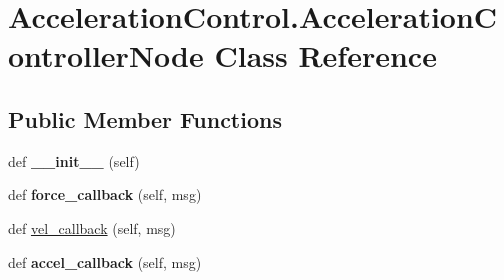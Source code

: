 \hypertarget{classAccelerationControl_1_1AccelerationControllerNode}{}\section{Acceleration\+Control.\+Acceleration\+Controller\+Node Class Reference}
\label{classAccelerationControl_1_1AccelerationControllerNode}
\subsection*{Public Member Functions}
\begin{DoxyCompactItemize}
\item 
\mbox{\label{classAccelerationControl_1_1AccelerationControllerNode_ae0b6610b5eed0e295361a93377fe3f10}} 
def {\bfseries \+\_\+\+\_\+init\+\_\+\+\_\+} (self)
\item 
\mbox{\label{classAccelerationControl_1_1AccelerationControllerNode_a78c603f42076650d9d232bb5b0abc5f3}} 
def {\bfseries force\+\_\+callback} (self, msg)
\item 
def \hyperlink{classAccelerationControl_1_1AccelerationControllerNode_ae3b309e67c7a8dc69b45c428407bb15f}{vel\+\_\+callback} (self, msg)
\item 
\mbox{\label{classAccelerationControl_1_1AccelerationControllerNode_a2b610d76f57eacfe987a5a7ddde66f96}} 
def {\bfseries accel\+\_\+callback} (self, msg)
\end{DoxyCompactItemize}
